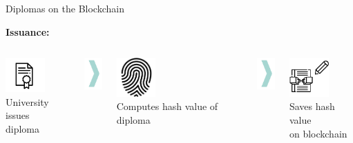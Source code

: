 \documentclass[]{beamer}
\begin{document}
\begin{frame}{Diplomas on the Blockchain}
	\begin{minipage}{\linewidth}
		\textbf{\large{Issuance:}}
			\begin{columns}
			\begin{column}{0.3\textwidth}
				\centering
				\includegraphics[width=1.5cm]{../assets/images/diploma.png}\\
				University issues\\
				diploma
				\end{column}
			\begin{column}{0.05\textwidth}
				\includegraphics[width=0.75cm]{../assets/images/big_arrow.png}
			\end{column}
			\begin{column}{0.3\textwidth}
				\centering
				\includegraphics[width=1.5cm]{../assets/images/fingerprint.png}\\
				Computes hash value of diploma
			\end{column}
			\begin{column}{0.05\textwidth}
				\includegraphics[width=0.75cm]{../assets/images/big_arrow.png}
			\end{column}
			\begin{column}{0.3\textwidth}
				\centering
				\includegraphics[width=1.5cm]{../assets/images/write_onchain.png}\\
				Saves hash value\\ on blockchain
			\end{column}
		\end{columns}

\end{minipage}
\end{frame}
\end{document}
